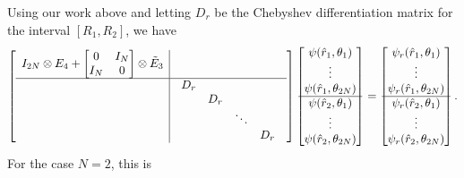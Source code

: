 Using our work above and letting $D_r$ be the Chebyshev differentiation
matrix for the interval $[R_1,R_2]$,
we have
\begin{align*}
 \left[
 \begin{array}{c|c}
  I_{2N} \otimes E_4 +
  \begin{bmatrix}
   0   & I_N \\
   I_N & 0
  \end{bmatrix} \otimes \tilde{E}_3 &    \\ \hline
  &
  \begin{array}{cccc}
   D_r &     &        & \\
       & D_r &        & \\
       &     & \ddots & \\
       &     &        & D_r
  \end{array}
 \end{array}
 \right]
 \begin{bmatrix}
  \psi(\hat{r}_1,\theta_1) \\ \vdots \\ \psi(\hat{r}_1,\theta_{2N}) \\ \hline
  \psi(\hat{r}_2,\theta_1) \\ \vdots \\ \psi(\hat{r}_2,\theta_{2N})
 \end{bmatrix}
 =
 \begin{bmatrix}
  \psi_r(\hat{r}_1,\theta_1) \\ \vdots \\ \psi_r(\hat{r}_1,\theta_{2N}) \\ \hline
  \psi_r(\hat{r}_2,\theta_1) \\ \vdots \\ \psi_r(\hat{r}_2,\theta_{2N})
 \end{bmatrix}.
\end{align*}
For the case $N = 2$, this is
